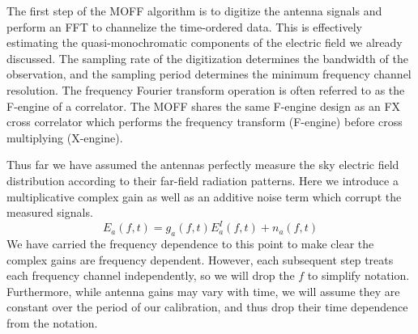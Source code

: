 \documentclass[a4paper,fleqn,usenatbib]{mnras}
\newcommand{\ra}{\ensuremath{\mathbf{r}_a}}
\newcommand{\beamr}{\ensuremath{\widetilde{W}}}
\newcommand{\Er}[1]{\ensuremath{\widetilde{E}_{#1}}}
\newcommand{\dif}{\mathrm{d}}
\begin{document}

The first step of the MOFF algorithm is to digitize the antenna signals and perform an FFT to 
channelize the time-ordered data. This is effectively estimating the quasi-monochromatic 
components of the electric field we already discussed. The sampling rate of the digitization 
determines the bandwidth of the observation, and the sampling period determines the minimum 
frequency channel resolution. The frequency Fourier transform operation is often referred to as 
the F-engine of a correlator. The MOFF shares the same F-engine design as an FX cross
correlator which performs the frequency transform (F-engine) before cross multiplying 
(X-engine). 


Thus far we have assumed the antennas perfectly measure the sky electric field distribution according to their far-field radiation patterns. Here we introduce a multiplicative complex gain as well as an additive noise term which corrupt the measured signals.
\begin{equation}\label{eq:apply_gain}
E_a(f,t) = g_a(f,t) E_a^I(f,t) + n_a(f,t)
\end{equation}
We have carried the frequency dependence to this point to make clear the complex gains are
frequency dependent. However, each subsequent step treats each frequency 
channel independently, so we will drop the $f$ to simplify notation. 
Furthermore, while antenna gains may vary with time, we will assume they are constant over
the period of our calibration, and thus drop their time dependence from the notation.
\end{document}
